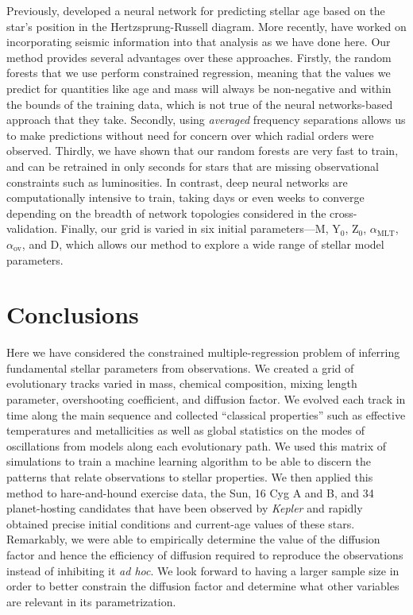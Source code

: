 \documentclass[manuscript,linenumbers]{aastex6}
\begin{document}
Previously, \citet{pulone1997age} developed a neural network for predicting stellar age based on the star's position in the Hertzsprung-Russell diagram. More recently, \citet{2016arXiv160200902V} have worked on incorporating seismic information into that analysis as we have done here. Our method provides several advantages over these approaches. Firstly, the random forests that we use perform constrained regression, meaning that the values we predict for quantities like age and mass will always be non-negative and within the bounds of the training data, which is not true of the neural networks-based approach that they take. Secondly, using \emph{averaged} frequency separations allows us to make predictions without need for concern over which radial orders were observed. Thirdly, we have shown that our random forests are very fast to train, and can be retrained in only seconds for stars that are missing observational constraints such as luminosities. In contrast, deep neural networks are computationally intensive to train, taking days or even weeks to converge depending on the breadth of network topologies considered in the cross-validation. Finally, our grid is varied in six initial parameters---M, Y$_0$, Z$_0$, $\alpha_{\text{MLT}}$, $\alpha_{\text{ov}}$, and D, which allows our method to explore a wide range of stellar model parameters.


\section{Conclusions}
Here we have considered the constrained multiple-regression problem of inferring fundamental stellar parameters from observations. We created a grid of evolutionary tracks varied in mass, chemical composition, mixing length parameter, overshooting coefficient, and diffusion factor. We evolved each track in time along the main sequence and collected ``classical properties'' such as effective temperatures and metallicities as well as global statistics on the modes of oscillations from models along each evolutionary path. We used this matrix of simulations to train a machine learning algorithm to be able to discern the patterns that relate observations to stellar properties. We then applied this method to hare-and-hound exercise data, the Sun, 16 Cyg A and B, and 34 planet-hosting candidates that have been observed by \emph{Kepler} and rapidly obtained precise initial conditions and current-age values of these stars.%
Remarkably, we were able to empirically determine the value of the diffusion factor and hence the efficiency of diffusion required to reproduce the observations instead of inhibiting it \emph{ad hoc}. We look forward to having a larger sample size in order to better constrain the diffusion factor and determine what other variables are relevant in its parametrization. 
\end{document}
